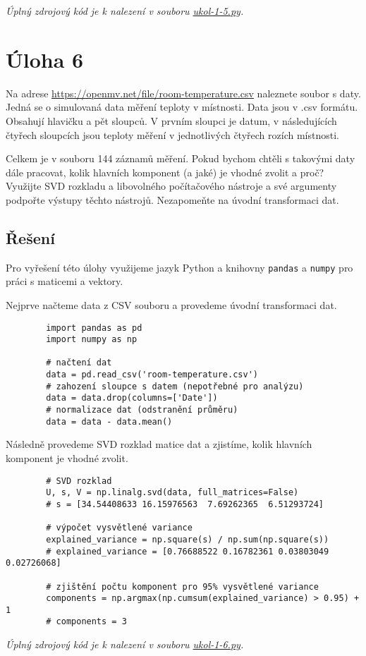 \documentclass[10pt, a4paper]{ReportSheet}
\newcommand{\uloha}[5]{
    \section{Úloha #1\hfill\small\normalfont{(#2 body)}}
    \label{sec:uloha-#1}
    #3
    \subsection{Řešení}
    \label{subsec:uloha-#1-reseni}
    #4
    \ifthenelse{\equal{#5}{false}}{}{\newpage}
}
\begin{document}
    \textit{
        Úplný zdrojový kód je k nalezení v souboru \href{https://github.com/filipditrich/MMAD-2024/blob/main/ukol-1-5.py}{ukol-1-5.py}.
    }
    \newpage

    \uloha{6}{3}{
        Na adrese \url{https://openmv.net/file/room-temperature.csv} naleznete soubor s daty. Jedná se o simulovaná data měření teploty v místnosti. Data jsou v .csv formátu. Obsahují hlavičku a pět sloupců. V prvním sloupci je datum, v následujících čtyřech sloupcích jsou teploty měření v jednotlivých čtyřech rozích místnosti.

        Celkem je v souboru 144 záznamů měření. Pokud bychom chtěli s takovými daty dále pracovat, kolik hlavních komponent (a jaké) je vhodné zvolit a proč?
        Využijte SVD rozkladu a libovolného počítačového nástroje a své argumenty podpořte výstupy těchto nástrojů. Nezapomeňte na úvodní transformaci dat.
    }{
        Pro vyřešení této úlohy využijeme jazyk Python a knihovny \texttt{pandas} a \texttt{numpy} pro práci s
        maticemi a vektory.
    }{false}
    Nejprve načteme data z CSV souboru a provedeme úvodní transformaci dat.
    \begin{verbatim}
        import pandas as pd
        import numpy as np

        # načtení dat
        data = pd.read_csv('room-temperature.csv')
        # zahození sloupce s datem (nepotřebné pro analýzu)
        data = data.drop(columns=['Date'])
        # normalizace dat (odstranění průměru)
        data = data - data.mean()
    \end{verbatim}

    Následně provedeme SVD rozklad matice dat a zjistíme, kolik hlavních komponent je vhodné zvolit.
    \begin{verbatim}
        # SVD rozklad
        U, s, V = np.linalg.svd(data, full_matrices=False)
        # s = [34.54408633 16.15976563  7.69262365  6.51293724]

        # výpočet vysvětlené variance
        explained_variance = np.square(s) / np.sum(np.square(s))
        # explained_variance = [0.76688522 0.16782361 0.03803049 0.02726068]

        # zjištění počtu komponent pro 95% vysvětlené variance
        components = np.argmax(np.cumsum(explained_variance) > 0.95) + 1
        # components = 3
    \end{verbatim}


    \textit{
        Úplný zdrojový kód je k nalezení v souboru \href{https://github.com/filipditrich/MMAD-2024/blob/main/ukol-1-6.py}{ukol-1-6.py}.
    }
    \newpage
\end{document}
